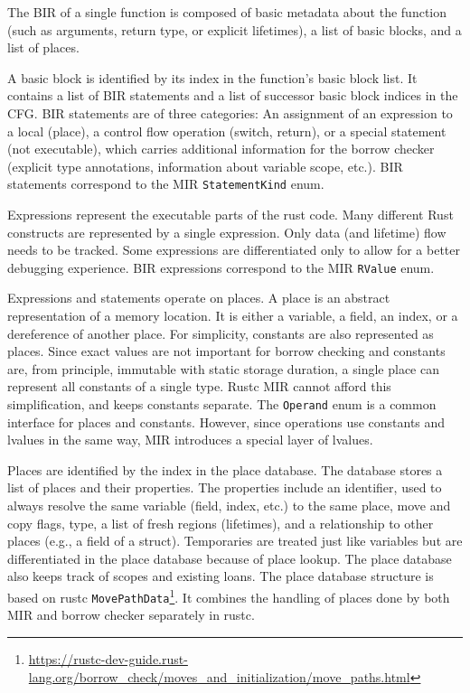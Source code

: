 \documentclass[
  11pt,
  twoside]{report}
\DeclareRobustCommand{\href}[2]{#2\footnote{\url{#1}}}
\begin{document}
The BIR of a single function is composed of basic metadata about the
function (such as arguments, return type, or explicit lifetimes), a list
of basic blocks, and a list of places.

A basic block is identified by its index in the function's basic block
list. It contains a list of BIR statements and a list of successor basic
block indices in the CFG. BIR statements are of three categories: An
assignment of an expression to a local (place), a control flow operation
(switch, return), or a special statement (not executable), which carries
additional information for the borrow checker (explicit type
annotations, information about variable scope, etc.). BIR statements
correspond to the MIR \texttt{StatementKind} enum.

Expressions represent the executable parts of the rust code. Many
different Rust constructs are represented by a single expression. Only
data (and lifetime) flow needs to be tracked. Some expressions are
differentiated only to allow for a better debugging experience. BIR
expressions correspond to the MIR \texttt{RValue} enum.

Expressions and statements operate on places. A place is an abstract
representation of a memory location. It is either a variable, a field,
an index, or a dereference of another place. For simplicity, constants
are also represented as places. Since exact values are not important for
borrow checking and constants are, from principle, immutable with static
storage duration, a single place can represent all constants of a single
type. Rustc MIR cannot afford this simplification, and keeps constants
separate. The \texttt{Operand} enum is a common interface for places and
constants. However, since operations use constants and lvalues in the
same way, MIR introduces a special layer of lvalues.

Places are identified by the index in the place database. The database
stores a list of places and their properties. The properties include an
identifier, used to always resolve the same variable (field, index,
etc.) to the same place, move and copy flags, type, a list of fresh
regions (lifetimes), and a relationship to other places (e.g., a field
of a struct). Temporaries are treated just like variables but are
differentiated in the place database because of place lookup. The place
database also keeps track of scopes and existing loans. The place
database structure is based on rustc
\href{https://rustc-dev-guide.rust-lang.org/borrow_check/moves_and_initialization/move_paths.html}{\texttt{MovePathData}}.
It combines the handling of places done by both MIR and borrow checker
separately in rustc.
\end{document}

